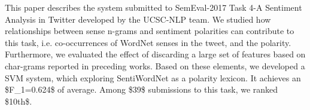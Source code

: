 This paper describes the system submitted to SemEval-2017 Task 4-A Sentiment Analysis in Twitter developed by the UCSC-NLP team. We studied how relationships between sense n-grams and sentiment polarities can contribute to this task, i.e. co-occurrences of WordNet senses in the tweet, and the polarity. Furthermore, we evaluated the effect of discarding a large set of features based on char-grams reported in preceding works. Based on these elements, we developed a SVM system, which exploring SentiWordNet as a polarity lexicon. It achieves an \$F\_1=0.624\$ of average. Among \$39\$ submissions to this task, we ranked \$10th\$.
